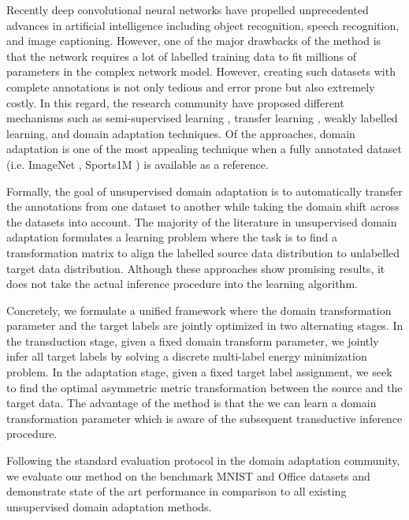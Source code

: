 \documentclass{article}
\begin{document}
Recently deep convolutional neural networks \cite{alexnet, vggnet, googlenet} have propelled unprecedented advances in artificial intelligence including object recognition, speech recognition, and image captioning. However, one of the major drawbacks of the method is that the network requires a lot of labelled training data to fit millions of parameters in the complex network model. However, creating such datasets with complete annotations is not only tedious and error prone but also extremely costly. In this regard, the research community have proposed different mechanisms such as semi-supervised learning \cite{semisup1,semisup2,semisup3}, transfer learning \cite{transfer1, transfer2}, weakly labelled learning, and domain adaptation techniques. Of the approaches, domain adaptation is one of the most appealing technique when a fully annotated dataset (i.e. ImageNet \cite{ImageNet}, Sports1M \cite{sports1m}) is available as a reference. 

Formally, the goal of unsupervised domain adaptation is to automatically transfer the annotations from one dataset to another while taking the domain shift across the datasets into account. The majority of the literature \cite{gong12, baochen15, fernando13, baochen16, tommasi13} in unsupervised domain adaptation formulates a learning problem where the task is to find a transformation matrix to align the labelled source data distribution to unlabelled target data distribution. Although these approaches show promising results, it does not take the actual inference procedure into the learning algorithm.

Concretely, we formulate a unified framework where the domain transformation parameter and the target labels are jointly optimized in two alternating stages. In the transduction stage, given a fixed domain transform parameter, we jointly infer all target labels by solving a discrete multi-label energy minimization problem. In the adaptation stage, given a fixed target label assignment, we seek to find the optimal asymmetric metric transformation between the source and the target data. The advantage of the method is that the we can learn a domain transformation parameter which is aware of the subsequent transductive inference procedure. 

Following the standard evaluation protocol in the domain adaptation community, we evaluate our method on the benchmark MNIST \cite{mnist} and Office \cite{office} datasets and demonstrate state of the art performance in comparison to all existing unsupervised domain adaptation methods.
\end{document}
